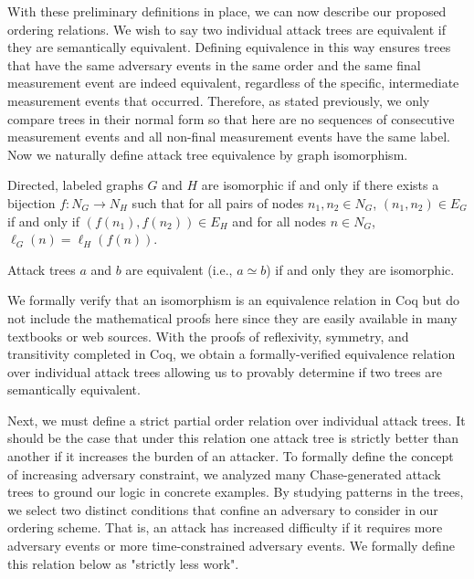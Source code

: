 \documentclass[runningheads]{llncs}
\theoremstyle{definition}
\begin{document}
With these preliminary definitions in place, we can now describe our proposed ordering relations. We wish to say two individual attack trees are equivalent if they are semantically equivalent. Defining equivalence in this way ensures trees that have the same adversary events in the same order and the same final measurement event are indeed equivalent, regardless of the specific, intermediate measurement events that occurred. Therefore, as stated previously, we only compare trees in their normal form so that here are no sequences of consecutive measurement events and all non-final measurement events have the same label. Now we naturally define attack tree equivalence by graph isomorphism.


\begin{definition}[Isomorphism]
    Directed, labeled graphs $G$ and $H$ are isomorphic if and only if there exists a bijection $f : N_G \to N_H$ such that for all pairs of nodes $n_1, n_2 \in N_G$, $(n_1,n_2) \in E_G$ if and only if $(f(n_1),f(n_2)) \in E_H$ and for all nodes $n \in N_G$, $\ell_G(n) = \ell_H(f(n))$.
\end{definition}


\begin{definition}
  Attack trees $a$ and $b$ are equivalent (i.e., $a \simeq b$) if and only they are isomorphic.
\end{definition}


\noindent We formally verify that an isomorphism is an equivalence relation in Coq but do not include the mathematical proofs here since they are easily available in many textbooks or web sources. With the proofs of reflexivity, symmetry, and transitivity completed in Coq, we obtain a formally-verified equivalence relation over individual attack trees allowing us to provably determine if two trees are semantically equivalent.


Next, we must define a strict partial order relation over individual attack trees. It should be the case that under this relation one attack tree is strictly better than another if it increases the burden of an attacker. To formally define the concept of increasing adversary constraint, we analyzed many Chase-generated attack trees to ground our logic in concrete examples. By studying patterns in the trees, we select two distinct conditions that confine an adversary to consider in our ordering scheme. That is, an attack has increased difficulty if it requires more adversary events or more time-constrained adversary events. We formally define this relation below as "strictly less work".
\end{document}
